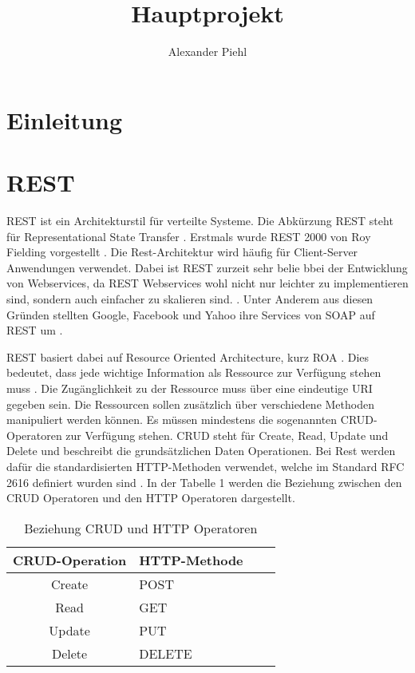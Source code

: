 \documentclass{llncs}
\title{Hauptprojekt}
\author{Alexander Piehl\\\email{alexander.piehl@haw-hamburg.de}
\institute{Hamburg University of Applied Sciences,\\Dept. Computer Science, \\ Berliner Tor 7\\ 20099 Hamburg, Germany\\}}
\begin{document}
\maketitle
\section{Einleitung}
\nocite{*}
\section{REST}
REST ist ein Architekturstil für verteilte Systeme. Die Abkürzung REST  steht für Representational State Transfer \cite{chakrabarti2009test}.
Erstmals wurde REST 2000 von Roy Fielding vorgestellt \citep{kao2013performance}.
Die Rest-Architektur wird häufig für Client-Server Anwendungen verwendet. 
Dabei ist REST zurzeit sehr belie bbei der  Entwicklung von Webservices, da REST Webservices wohl nicht nur leichter zu implementieren sind, sondern auch einfacher zu skalieren sind. \cite{chakrabarti2009test}. 
Unter Anderem aus diesen Gründen stellten Google, Facebook und Yahoo ihre Services von SOAP auf REST um \cite{rodriguez2008restful, navas2014rest}.

REST basiert dabei auf Resource Oriented Architecture, kurz ROA \citep{chakrabarti2009test}. Dies bedeutet, dass jede wichtige Information als Ressource zur Verfügung stehen muss \cite{porres2011modeling}.
Die Zugänglichkeit zu der Ressource muss über eine eindeutige URI gegeben sein. Die Ressourcen sollen zusätzlich über verschiedene Methoden manipuliert werden können. Es müssen mindestens die sogenannten CRUD-Operatoren zur Verfügung stehen. CRUD steht für Create, Read, Update und Delete und beschreibt die grundsätzlichen Daten Operationen. Bei Rest werden dafür die standardisierten HTTP-Methoden verwendet, welche im Standard RFC 2616 definiert wurden sind \citep{kao2013performance}. In der Tabelle 1 werden die Beziehung zwischen den CRUD Operatoren und den HTTP Operatoren dargestellt.

\begin{table}[]
\centering
\label{CRUD_HTTP_Methods}
\begin{tabular}{|c|l|p{4cm}|p{4cm}|}
\hline
\multicolumn{1}{|l|}{CRUD-Operation} & HTTP-Methode \\ \hline
Create & POST  \\ \hline
Read & GET \\ \hline
Update & PUT \\ \hline
Delete & DELETE \\ \hline
\end{tabular}
\caption{Beziehung CRUD und HTTP Operatoren \cite{reza2010framework}}
\end{table}
\end{document}
